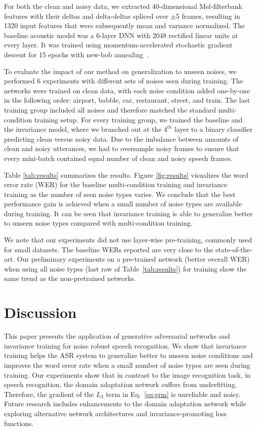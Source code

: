 \documentclass[a4paper]{article}
\begin{document}
For both the clean and noisy data, we extracted 40-dimensional Mel-filterbank features with their deltas and 
delta-deltas spliced over $\pm$5 frames, resulting in 1320 input 
features that were subsequently mean and variance normalized. The baseline
acoustic model was a 6-layer 
DNN with 2048 rectified linear units at every layer. It was trained using 
momentum-accelerated stochastic gradient descent for 15 epochs with new-bob 
annealing~\citep[as in][]{morgan1995continuous,sainath2011making}.

To evaluate the impact of our method on generalization to unseen noises,
we performed 6 experiments with different sets of noises seen during training.
The networks were trained
on clean data, with each noise condition added one-by-one in the following order: airport, babble, car, 
restaurant, street, and train. The last training group included all noises and therefore matched the
standard multi-condition training setup. For every training group, we trained the
baseline and the invariance model, where we branched out at the $4^{th}$ layer to a
binary classifier predicting clean versus noisy data. Due to the imbalance between amounts of clean and
noisy utterances, we had to oversample noisy frames to ensure that every mini-batch contained
equal number of clean and noisy speech frames.

Table \ref{tab:results} summarizes the results. Figure \ref{fig:results} visualizes 
the word error rate (WER) for the baseline multi-condition training and invariance training 
as the number of seen noise types varies. We conclude that the best performance
gain is achieved when a small number of noise types are available during training. 
It can be seen that invariance training is able to generalize better to unseen 
noise types compared with multi-condition training.

We note that our experiments did not use layer-wise pre-training, commonly used for small
datasets. The baseline WERs reported are very close to the state-of-the-art. 
Our preliminary experiments on a pre-trained network (better overall WER) when 
using all noise types (last row of Table~\ref{tab:results}) for training show 
the same trend as the non-pretrained networks.

\section{Discussion}
\label{sec:discussion}
    This paper presents the application of generative adversarial networks and 
    invariance training for noise robust speech recognition. We show that invariance training 
    helps the ASR system to generalize better to unseen noise conditions and improves 
    the word error rate when a small number of noise types are seen during training. Our 
    experiments show that in contrast to the image recognition task, in speech 
    recognition, the domain adaptation network suffers from underfitting. Therefore, the 
    gradient of the $L_3$ term in Eq.~\ref{eq:grm} is unreliable and noisy. Future 
    research includes enhancements to the domain adaptation network while exploring 
    alternative network architectures and invariance-promoting loss functions.
\end{document}
